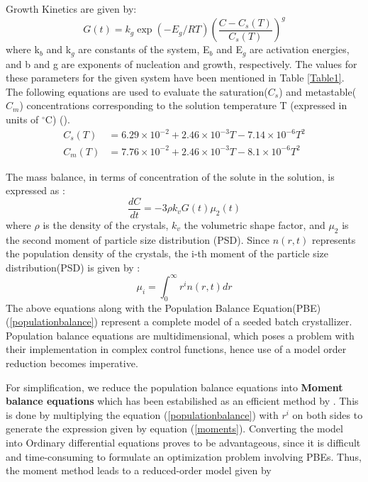 \documentclass[3p,times,authoryear]{elsarticle}
\begin{document}
Growth Kinetics are given by:
\begin{equation}
G(t) = k_{g}\exp{\left(-E_{g}/RT \right)}\left(\frac{C - C_{s}(T)}{C_{s}(T)}\right)^{g}
\end{equation}
where k$_{b}$ and k$_{g}$ are constants of the system, E$_{b}$ and E$_{g}$ are activation energies, and b and g are exponents of nucleation and growth, respectively. The values for these parameters for the given system have been mentioned in Table \ref{Table1}. The following equations are used to evaluate the saturation($C_{s}$) and metastable($C_{m}$) concentrations corresponding to the solution temperature T (expressed in units of $^\circ$C) (\cite{shi}). \\
\begin{align}
C_{s}(T) &= 6.29\times10^{-2} + 2.46\times10^{-3}T - 7.14\times10^{-6}T^{2} \label{sat}\\
C_{m}(T) &= 7.76\times10^{-2} + 2.46\times10^{-3}T - 8.1\times10^{-6}T^{2} \label{meta}
\end{align}

 
The mass balance, in terms of concentration of the solute in the solution, is expressed as :
\begin{equation}
\frac{dC}{dt} = -3\rho{}k_{v}G(t)\mu_{2}(t)
\end{equation}
where $\rho{}$ is the density of the crystals, $k_{v}$ the volumetric shape factor, and $\mu_{2}$ is the second moment of particle size distribution (PSD).
Since $n(r,t)$ represents the population density of the crystals, the i-th moment of the particle size distribution(PSD) is given by :
\begin{equation} \label{moments}
\mu_{i} = \int_{0}^{\infty} r^{i}n(r,t) dr
\end{equation}
The above equations along with the Population Balance Equation(PBE) (\ref{populationbalance}) represent a complete model of a seeded batch crystallizer. 
Population balance equations are multidimensional, which poses a problem with their implementation in complex control functions, hence use of a model order reduction becomes imperative.\par
For simplification, we reduce the population balance equations into \textbf{Moment balance equations} which has been estabilished as an efficient method by \cite{yenkie}. This is done by multiplying the equation (\ref{populationbalance})  with $r^{i}$ on both sides to generate the expression given by equation (\ref{moments}). Converting the model into Ordinary differential equations proves to be advantageous, since it is difficult and time-consuming to formulate an optimization problem involving PBEs. Thus, the moment method leads to a reduced-order model given by 
\end{document}
